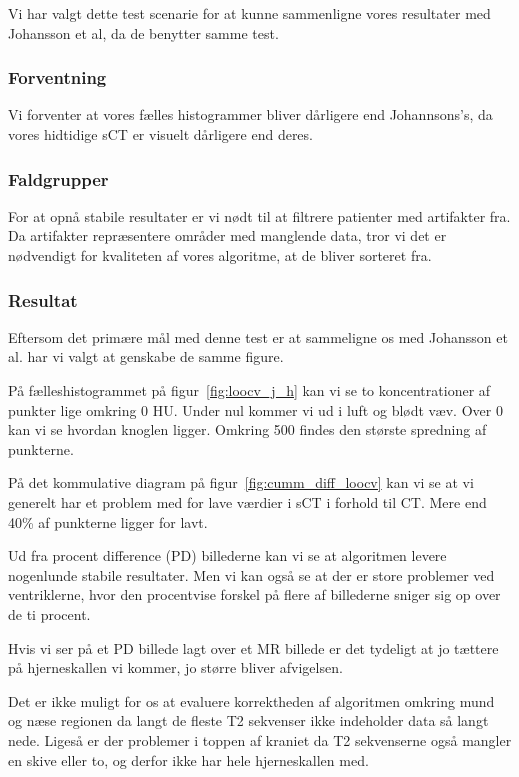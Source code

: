 Vi har valgt dette test scenarie for at kunne sammenligne vores resultater med Johansson et al, da de benytter samme test.

\subsubsection{Forventning}
Vi forventer at vores fælles histogrammer bliver dårligere end Johannsons's, da vores hidtidige sCT er visuelt dårligere end deres.


\subsubsection{Faldgrupper}
For at opnå stabile resultater er vi nødt til at filtrere patienter med artifakter fra. Da artifakter repræsentere områder med manglende data, tror vi det er nødvendigt for kvaliteten af vores algoritme, at de bliver sorteret fra.

\subsubsection{Resultat}

Eftersom det primære mål med denne test er at sammeligne os med Johansson et al. har vi valgt at genskabe de samme figure.

På fælleshistogrammet på figur~\ref{fig:loocv_j_h} kan vi se to koncentrationer af punkter lige omkring 0 HU. Under nul kommer vi ud i luft og blødt væv. Over 0 kan vi se hvordan knoglen ligger. Omkring 500 findes den største spredning af punkterne.

På det kommulative diagram på figur~\ref{fig:cumm_diff_loocv} kan vi se at vi generelt har et problem med for lave værdier i sCT i forhold til CT. Mere end 40\% af punkterne ligger for lavt.

Ud fra procent difference (PD) billederne kan vi se at algoritmen levere nogenlunde stabile resultater. Men vi kan også se at der er store problemer ved ventriklerne, hvor den procentvise forskel på flere af billederne sniger sig op over de ti procent.

Hvis vi ser på et PD billede lagt over et MR billede er det tydeligt at jo tættere på hjerneskallen vi kommer, jo større bliver afvigelsen.

Det er ikke muligt for os at evaluere korrektheden af algoritmen omkring mund og næse regionen da langt de fleste T2 sekvenser ikke indeholder data så langt nede. Ligeså er der problemer i toppen af kraniet da T2 sekvenserne også mangler en skive eller to, og derfor ikke har hele hjerneskallen med.

